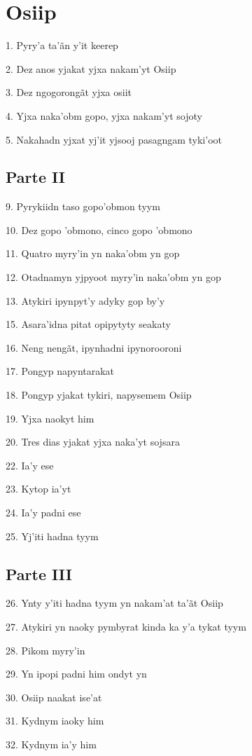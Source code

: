 \section{Osiip}

1. Pyry'a ta'ãn y'it keerep

2. Dez anos yjakat yjxa nakam'yt Osiip

3. Dez ngogorongãt yjxa osiit

4. Yjxa naka'obm gopo, yjxa nakam'yt sojoty

5. Nakahadn yjxat yj'it yjsooj pasagngam tyki'oot

\subsection{Parte II}

9. Pyrykiidn taso gopo'obmon tyym

10. Dez gopo 'obmono, cinco gopo 'obmono

11. Quatro myry'in yn naka'obm yn gop

12. Otadnamyn yjpyoot myry'in naka'obm yn gop

13. Atykiri ipynpyt'y adyky gop by'y

15. Asara'idna pitat opipytyty seakaty

16. Neng nengãt, ipynhadni ipynorooroni

17. Pongyp napyntarakat

18. Pongyp yjakat tykiri, napysemem Osiip

19. Yjxa naokyt him

20. Tres dias yjakat yjxa naka'yt sojsara

22. Ia'y ese

23. Kytop ia'yt

24. Ia'y padni ese

25. Yj'iti hadna tyym

\subsection{Parte III}

26. Ynty y'iti hadna tyym yn nakam'at ta'ãt Osiip

27. Atykiri yn naoky pymbyrat kinda ka y'a tykat tyym

28. Pikom myry'in

29. Yn ipopi padni him ondyt yn

30. Osiip naakat ise'at

31. Kydnym iaoky him

32. Kydnym ia'y him

